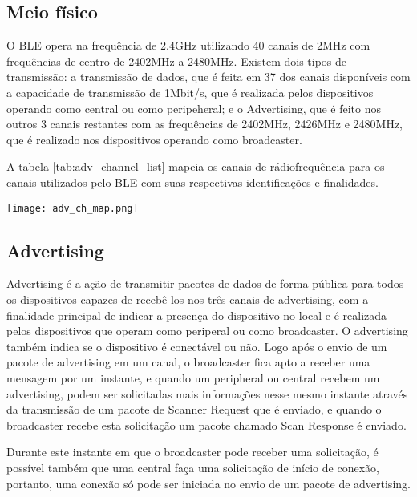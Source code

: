 \subsection{Meio físico}
O BLE opera na frequência de 2.4GHz utilizando 40 canais de 2MHz com
frequências de centro de 2402MHz a 2480MHz. Existem dois tipos de transmissão: a
transmissão de dados, que é feita em 37 dos canais disponíveis com a capacidade
de transmissão de 1Mbit/s, que é realizada pelos dispositivos operando como
central ou como peripeheral; e o Advertising, que é feito nos outros 3 canais
restantes com as frequências de 2402MHz, 2426MHz e 2480MHz, que
é realizado nos dispositivos operando como broadcaster.\cite{ble4core}

A tabela \ref{tab:adv_channel_list} mapeia os canais de rádiofrequência para os canais
utilizados pelo BLE com suas respectivas identificações e finalidades. 	

\begin{center}
	\centering 
	\texttt{[image: adv\_ch\_map.png]}
	\label{tab:adv_channel_list}
\end{center} 
 
\subsection{Advertising}
Advertising é a ação de transmitir pacotes de dados de forma pública para todos
os dispositivos capazes de recebê-los nos três canais de advertising, com a
finalidade principal de indicar a presença do dispositivo no local e é
realizada pelos dispositivos que operam como periperal ou como broadcaster. O
advertising também indica se o dispositivo é conectável ou não.
Logo após o envio de um pacote de advertising em um canal, o broadcaster fica 
apto a receber uma mensagem por um instante, e quando um peripheral ou central
recebem um advertising, podem ser solicitadas mais  informações nesse mesmo 
instante através da transmissão de um pacote de Scanner  Request que é enviado,
e quando o broadcaster recebe esta solicitação um pacote  chamado Scan Response
é enviado.\cite{ble4core} 

Durante este instante em que o broadcaster pode receber uma solicitação, é
possível também que uma central faça uma solicitação de início de conexão,
portanto, uma conexão só pode ser iniciada no envio de um pacote de advertising.
\cite{ble4core}

